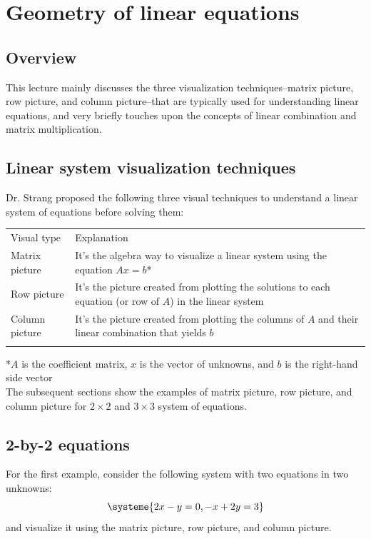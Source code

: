 \documentclass[../main.tex]{subfiles}
\begin{document}
\section{Geometry of linear equations}

\subsection{Overview}
This lecture mainly discusses the three visualization techniques--matrix picture, row picture, and column picture--that are typically used for understanding linear equations, and very briefly touches upon the concepts of linear combination and matrix multiplication.

\subsection{Linear system visualization techniques}
Dr. Strang proposed the following three visual techniques to understand a linear system of equations before solving them: \\
\begin{tabular}{@{}ll@{}} \trule
    \textrm{Visual type} & \textrm{Explanation}                                                  \\ \mrule
    Matrix picture       & \makecell[tl]{It's the algebra way to visualize a linear system using \\ the equation $Ax = b$*} \\
    Row picture          & \makecell[tl]{It's the picture created from plotting the solutions to \\ each equation (or row of $A$) in the linear system} \\
    Column picture       & \makecell[tl]{It's the picture created from plotting the columns of   \\ $A$ and their linear combination that yields $b$} \\ \brule
\end{tabular}
*$A$ is the coefficient matrix, $x$ is the vector of unknowns, and $b$ is the right-hand side vector \\

The subsequent sections show the examples of matrix picture, row picture, and column picture for $2 \times 2$ and $3 \times 3$ system of equations.

\subsection{2-by-2 equations}
For the first example, consider the following system with two equations in two unknowns:
\[
    \systeme{2x - y = 0, -x + 2y = 3}
\]
and visualize it using the matrix picture, row picture, and column picture.
\end{document}
